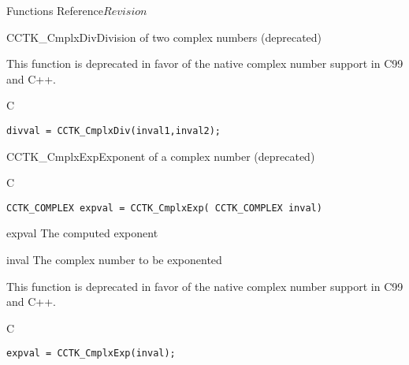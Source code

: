 \begin{cactuspart}{ Functions Reference}{}{$Revision$}
\begin{FunctionDescription}{CCTK\_CmplxDiv}{Division of two complex numbers (deprecated)}
\begin{Discussion}
This function is deprecated in favor of the native complex number support in
C99 and C++.
\end{Discussion}
\begin{ExampleSection}
\begin{Example}{C}
\begin{verbatim}
divval = CCTK_CmplxDiv(inval1,inval2);
\end{verbatim}
\end{Example}
\end{ExampleSection}
\end{FunctionDescription}


\begin{FunctionDescription}{CCTK\_CmplxExp}{Exponent of a complex number (deprecated)}
\label{CCTK-CmplxExp}
\begin{SynopsisSection}
\begin{Synopsis}{C}
\begin{verbatim}CCTK_COMPLEX expval = CCTK_CmplxExp( CCTK_COMPLEX inval)\end{verbatim}
\end{Synopsis}
\end{SynopsisSection}
\begin{ParameterSection}
\begin{Parameter}{expval}
The computed exponent
\end{Parameter}
\begin{Parameter}{inval}
The complex number to be exponented
\end{Parameter}
\end{ParameterSection}
\begin{Discussion}
This function is deprecated in favor of the native complex number support in
C99 and C++.
\end{Discussion}
\begin{ExampleSection}
\begin{Example}{C}
\begin{verbatim}
expval = CCTK_CmplxExp(inval);
\end{verbatim}
\end{Example}
\end{ExampleSection}
\end{FunctionDescription}


\end{cactuspart}
